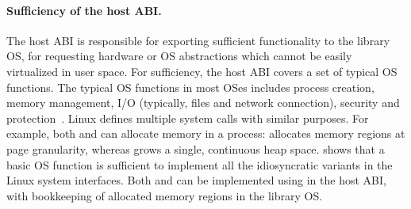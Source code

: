 \paragraph{Sufficiency of the host ABI.}
The host ABI is responsible for exporting sufficient functionality to the library OS,
for requesting hardware or OS abstractions which cannot be easily virtualized in user space.
For sufficiency, the host ABI
covers a set of typical OS functions.
The typical OS functions in most OSes
includes
process creation, memory management, I/O (typically, files and network connection), security and protection~\cite{dhamdhere2007os-textbook}.
Linux defines multiple system calls with similar purposes.
For example, both  and  can allocate memory in a process:
 allocates memory regions at page granularity, whereas  grows a single, continuous heap space.
\graphene{} shows
that a basic OS function is sufficient to implement all the idiosyncratic variants in the Linux system interfaces. Both  and  can be implemented using  in the host ABI, with bookkeeping of allocated memory regions in the library OS.


